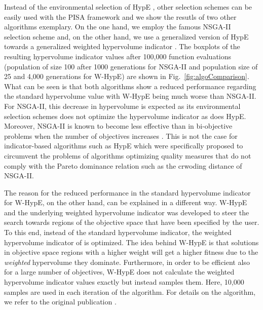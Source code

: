 \documentclass[preprint,12pt]{elsarticle}
\begin{document}
Instead of the environmental selection of HypE \citep{bz2011a}, other selection schemes can be easily used with the PISA framework and we show the resutls of two other algorithms exemplary. On the one hand, we employ the famous NSGA-II selection scheme \citep{dapm2002a} and, on the other hand, we use a generalized version of HypE towards a generalized weighted hypervolume indicator \citep{abbz2009b,bbtz2011a}. The boxplots of the resulting hypervolume indicator values after 100,000 function evaluations (population of size 100 after 1000 generations for NSGA-II and population size of 25 and 4,000 generations for W-HypE) are shown in Fig.~\ref{fig:algoComparison}. What can be seen is that both algorithms show a reduced performance regarding the standard hypervolume value with W-HypE being much worse than NSGA-II. For NSGA-II, this decrease  in hypervolume is expected as its environmental selection schemes does not optimize the hypervolume indicator as does HypE. Moreover, NSGA-II is known to become less effective than in bi-objective problems when the number of objectives increases \citep{wbn2007a,bz2011a}. This is not the case for indicator-based algorithms such as HypE which were specifically proposed to circumvent the problems of algorithms optimizing quality measures that do not comply with the Pareto dominance relation such as the crwoding distance of NSGA-II.

The reason for the reduced performance in the standard hypervolume indicator for W-HypE, on the other hand, can be explained in a different way. W-HypE and the underlying weighted hypervolume indicator was developed to steer the search towards regions of the objective space that have been specified by the user. To this end, instead of the standard hypervolume indicator, the weighted hypervolume indicator of \citep{zbt2007a} is optimized. The idea behind W-HypE is that solutions in objective space regions with a higher weight will get a higher fitness due to the \emph{weighted} hypervolume they dominate. Furthermore, in order to be efficient also for a large number of objectives, W-HypE does not calculate the weighted hypervolume indicator values exactly but instead samples them. Here, 10,000 samples are used in each iteration of the algorithm. For details on the algorithm, we refer to the original publication \citep{bz2011a}.
\end{document}
